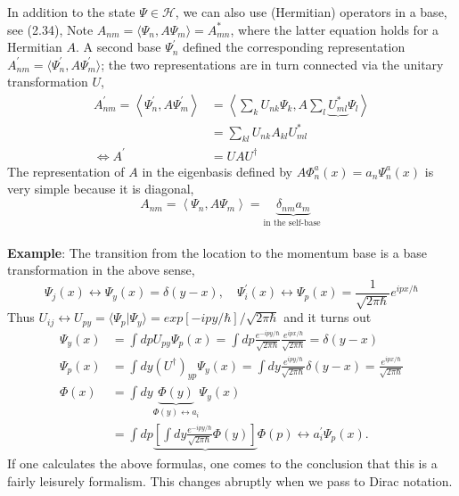 In addition to the state $\Psi\in\mathcal{H}$, we can also use (Hermitian) operators in a base, see (2.34), Note $A_{nm}=\langle \Psi_n,A\Psi_m\rangle=A^*_{mn}$, where the latter equation holds for a Hermitian $A$. A second base {$\Psi^{\prime}_n$} defined
the corresponding representation $A_{nm}^{\prime}=\langle\Psi^{\prime}_n,A\Psi_m^{\prime}\rangle$; the two representations are in turn connected via the unitary transformation $U$,
\begin{equation}
\begin{aligned} A_{n m}^{\prime}=\left\langle\Psi_{n}^{\prime}, A \Psi_{m}^{\prime}\right\rangle &=\left\langle\sum_{k} U_{n k} \Psi_{k}, A \sum_{l} \underbrace{U_{m l}^{*}} \Psi_{l}\right\rangle \\ &=\sum_{k l} U_{n k} A_{k l} U_{m l}^{*} \\ \Leftrightarrow A^{\prime} &=U A U^{\dagger} \end{aligned}
\end{equation}
The representation of $A$ in the eigenbasis defined by $A\Phi^a_n(x)=a_n\Psi_n^a(x)$ is very simple because it is diagonal,
\begin{equation}
    A_{n m}=\left\langle\Psi_{n}, A \Psi_{m}\right\rangle=\underbrace{\delta_{n m} a_{m}}_{\text {in the self-base }}
    \end{equation}\\
\textbf{Example}: The transition from the location to the momentum base is a base transformation in the above sense,
\begin{equation}
    \Psi_{j}(x) \leftrightarrow \Psi_{y}(x)=\delta(y-x), \quad \Psi_{i}^{\prime}(x) \leftrightarrow \Psi_{p}(x)=\frac{1}{\sqrt{2 \pi \hbar}} e^{i p x / \hbar}
    \end{equation}
Thus $U_{ij}\leftrightarrow U_{py}=\langle\Psi_p|\Psi_y\rangle=exp[-ipy/\hbar]/\sqrt{2\pi\hbar}$ and it turns out
\begin{equation}
\begin{aligned} \Psi_{y}(x) &=\int d p U_{p y} \Psi_{p}(x)=\int d p \frac{e^{-i p y / \hbar}}{\sqrt{2 \pi \hbar}} \frac{e^{i p x / \hbar}}{\sqrt{2 \pi \hbar}}=\delta(y-x) \\ 
\Psi_{p}(x) &=\int d y\left(U^{\dagger}\right)_{y p} \Psi_{y}(x)=\int d y \frac{e^{i p y / \hbar}}{\sqrt{2 \pi \hbar}} \delta(y-x)=\frac{e^{i p x / \hbar}}{\sqrt{2 \pi \hbar}} \\
\Phi(x) &=\int d y \underbrace{\Phi(y)}_{\Phi(y) \leftrightarrow a_{i}} \Psi_{y}(x) \\ 
&=\int d p \underbrace{\left[\int d y \frac{e^{-i p y / \hbar}}{\sqrt{2 \pi \hbar}}\Phi(y)\right]}{\Phi(p) \leftrightarrow a_{i}^{\prime}} \Psi_{p}(x).  \end{aligned}
\end{equation}
If one calculates the above formulas, one comes to the conclusion that this is a fairly leisurely formalism. This changes abruptly when we pass to Dirac notation.

